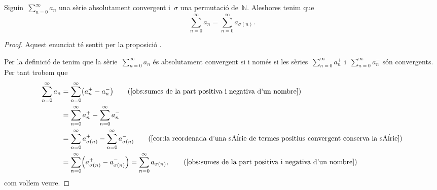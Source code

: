 \documentclass[../../main.tex]{subfiles}
\begin{document}
    \begin{lemma}
        Siguin~\(\sum_{n=0}^{\infty}a_{n}\) una sèrie absolutament convergent i~\(\sigma\) una permutació de~\(\mathbb{N}\).
        Aleshores tenim que
        \[
            \sum_{n=0}^{\infty}a_{n}=\sum_{n=0}^{\infty}a_{\sigma(n)}.
        \]
        \begin{proof}
            Aquest enunciat té sentit per la proposició .

            Per la definició de  tenim que la sèrie~\(\sum_{n=0}^{\infty}a_{n}\) és absolutament convergent si i només si les sèries~\(\sum_{n=0}^{\infty}a^{+}_{n}\) i~\(\sum_{n=0}^{\infty}a^{-}_{n}\) són convergents.
            Per tant trobem que
            \begin{align*}
                \sum_{n=0}^{\infty}a_{n}&=\sum_{n=0}^{\infty}\left(a^{+}_{n}-a^{-}_{n}\right) \tag{\ref{obs:sumes de la part positiva i negativa d'un nombre}}\\
                &=\sum_{n=0}^{\infty}a^{+}_{n}-\sum_{n=0}^{\infty}a^{-}_{n} \\
                &=\sum_{n=0}^{\infty}a^{+}_{\sigma(n)}-\sum_{n=0}^{\infty}a^{-}_{\sigma(n)} \tag{\ref{cor:la reordenada d'una sèrie de termes positius convergent conserva la sèrie}}\\
                &=\sum_{n=0}^{\infty}\left(a^{+}_{\sigma(n)}-a^{-}_{\sigma(n)}\right)=\sum_{n=0}^{\infty}a_{\sigma(n)}, \tag{\ref{obs:sumes de la part positiva i negativa d'un nombre}}
            \end{align*}
            com volíem veure.
        \end{proof}
    \end{lemma}
\end{document}
